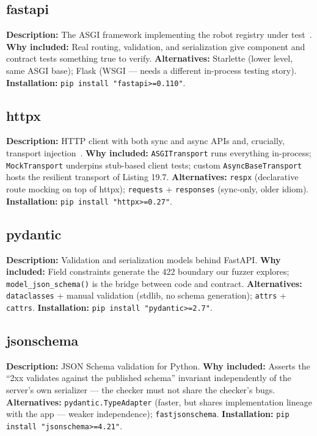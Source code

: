 \subsection{fastapi}
\textbf{Description:} The ASGI framework implementing the robot registry
under test~\cite{fastapidocs}.
\textbf{Why included:} Real routing, validation, and serialization give
component and contract tests something true to verify.
\textbf{Alternatives:} Starlette (lower level, same ASGI base); Flask
(WSGI --- needs a different in-process testing story).
\textbf{Installation:} \texttt{pip install "fastapi>=0.110"}.

\subsection{httpx}
\textbf{Description:} HTTP client with both sync and async APIs and,
crucially, transport injection~\cite{httpxdocs}.
\textbf{Why included:} \texttt{ASGITransport} runs everything in-process;
\texttt{MockTransport} underpins stub-based client tests; custom
\texttt{AsyncBaseTransport} hosts the resilient transport of Listing 19.7.
\textbf{Alternatives:} \texttt{respx} (declarative route mocking on top of
httpx); \texttt{requests} + \texttt{responses} (sync-only, older idiom).
\textbf{Installation:} \texttt{pip install "httpx>=0.27"}.

\subsection{pydantic}
\textbf{Description:} Validation and serialization models behind FastAPI.
\textbf{Why included:} Field constraints generate the 422 boundary our
fuzzer explores; \texttt{model\_json\_schema()} is the bridge between code
and contract.
\textbf{Alternatives:} \texttt{dataclasses} + manual validation (stdlib,
no schema generation); \texttt{attrs} + \texttt{cattrs}.
\textbf{Installation:} \texttt{pip install "pydantic>=2.7"}.

\subsection{jsonschema}
\textbf{Description:} JSON Schema validation for Python.
\textbf{Why included:} Asserts the ``2xx validates against the published
schema'' invariant independently of the server's own serializer --- the
checker must not share the checker's bugs.
\textbf{Alternatives:} \texttt{pydantic.TypeAdapter} (faster, but shares
implementation lineage with the app --- weaker independence);
\texttt{fastjsonschema}.
\textbf{Installation:} \texttt{pip install "jsonschema>=4.21"}.

